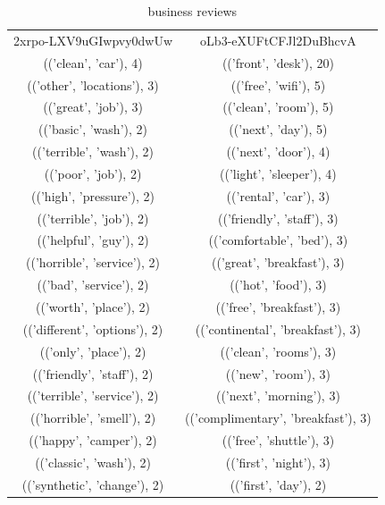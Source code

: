 \documentclass[sigchi]{acmart}
\begin{document}
	\begin{center}
		\tiny
		\begin{table}[!h]
		\caption{business reviews}
		\begin{tabular}{c c}
			2xrpo-LXV9uGIwpvy0dwUw		&oLb3-eXUFtCFJl2DuBhcvA\\
			(('clean', 'car'), 4)		&(('front', 'desk'), 20)\\
			(('other', 'locations'), 3)		&(('free', 'wifi'), 5)\\
			(('great', 'job'), 3)		&(('clean', 'room'), 5)\\
			(('basic', 'wash'), 2)		&(('next', 'day'), 5)\\
			(('terrible', 'wash'), 2)		&(('next', 'door'), 4)\\
			(('poor', 'job'), 2)		&(('light', 'sleeper'), 4)\\
			(('high', 'pressure'), 2)		&(('rental', 'car'), 3)\\
			(('terrible', 'job'), 2)		&(('friendly', 'staff'), 3)\\
			(('helpful', 'guy'), 2)		&(('comfortable', 'bed'), 3)\\
			(('horrible', 'service'), 2)		&(('great', 'breakfast'), 3)\\
			(('bad', 'service'), 2)		&(('hot', 'food'), 3)\\
			(('worth', 'place'), 2)		&(('free', 'breakfast'), 3)\\
			(('different', 'options'), 2)		&(('continental', 'breakfast'), 3)\\
			(('only', 'place'), 2)		&(('clean', 'rooms'), 3)\\
			(('friendly', 'staff'), 2)		&(('new', 'room'), 3)\\
			(('terrible', 'service'), 2)		&(('next', 'morning'), 3)\\
			(('horrible', 'smell'), 2)		&(('complimentary', 'breakfast'), 3)\\
			(('happy', 'camper'), 2)		&(('free', 'shuttle'), 3)\\
			(('classic', 'wash'), 2)		&(('first', 'night'), 3)\\
			(('synthetic', 'change'), 2)		&(('first', 'day'), 2)\\
		\end{tabular}
	\end{table}
	\end{center}
\end{document}

